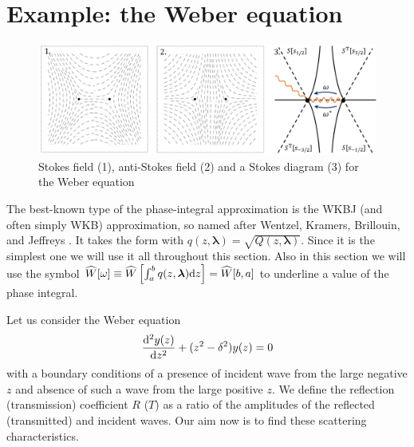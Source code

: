 \documentclass[12pt]{iopart}
\def\W{\widehat{W}}
\def\lmbd{\bm{\lambda}}
\def\w{\omega}
\newcommand\phsintgrnd[1][z]{q(#1,\lmbd)}
\newcommand\phsintgrl[3][z]{\int_{#2}^{#3} \phsintgrnd[#1] \rmd #1}
\begin{document}
\section{Example: the Weber equation \label{sec:weber}}

\begin{figure}
\centering
\noindent
\includegraphics[width=\textwidth]{stuff/wsd.png}
\caption{Stokes field (1), anti-Stokes field (2) and a Stokes diagram (3) for the Weber equation }
\label{fig:wsd}
\end{figure} 

The best-known type of the phase-integral approximation is the WKBJ (and often simply WKB) approximation, 
so named after Wentzel, Kramers, Brillouin, and Jeffreys \cite{wkb1,wkb2,wkb3,wkbj}. 
It takes the form  with $\phsintgrnd = \sqrt{Q(z,\lmbd)}$. Since it is the simplest one
we will use it all throughout this section. Also in this section we will use the symbol 
$\W[\w] \equiv \W \left[\phsintgrl{a}{b} \right] = \W[b,a]$ to underline a value of the phase integral. 


Let us consider the Weber equation
\begin{eqnarray}
\frac{\mathrm{d}^2 y(z)}{\mathrm{d} z^2}+(z^2-\delta^2)y(z)=0
\label{eq:weber}
\end{eqnarray}
with a boundary conditions of a presence of incident wave from the large negative $z$ and absence of such 
a wave from the large positive $z$. We define the reflection (transmission) coefficient $R$ ($T$) as
a ratio of the amplitudes of the reflected (transmitted) and incident waves. 
Our aim now is to find these scattering characteristics.
\end{document}
